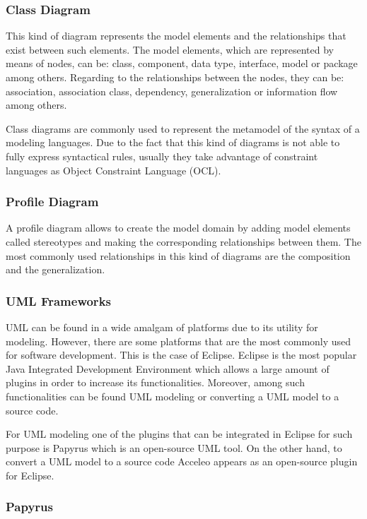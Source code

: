 \subsubsection*{Class Diagram}

This kind of diagram represents the model elements and the relationships that exist between such elements. The model elements, which are represented by means of nodes, can be: class, component, data type, interface, model or package among others. Regarding to the relationships between the nodes, they can be: association, association class, dependency, generalization or information flow among others.

Class diagrams are commonly used to represent the metamodel of the syntax of a modeling languages. Due to the fact that this kind of diagrams is not able to fully express syntactical rules, usually they take advantage of constraint languages as Object Constraint Language (OCL).

\subsubsection*{Profile Diagram}

A profile diagram allows to create the model domain by adding model elements called stereotypes and making the corresponding relationships between them. The most commonly used relationships in this kind of diagrams are the composition and the generalization.

\subsubsection{UML Frameworks} %

UML can be found in a wide amalgam of platforms due to its utility for modeling. However, there are some platforms that are the most commonly used for software development. This is the case of Eclipse.  Eclipse is the most popular Java Integrated Development Environment which allows a large amount of plugins in order to increase its functionalities. Moreover, among such functionalities can be found UML modeling or converting a UML model to a source code.

For UML modeling one of the plugins that can be integrated in Eclipse for such purpose is Papyrus which is an open-source UML tool. On the other hand, to convert a UML model to a source code Acceleo appears as an open-source plugin for Eclipse.

\subsubsection*{Papyrus}


